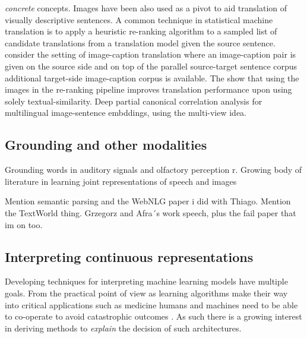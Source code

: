 \emph{concrete} concepts.
Images have been also used as a pivot to aid translation of visually descriptive sentences.
A common technique in statistical machine translation is to apply a heuristic re-ranking algorithm
to a sampled list of candidate translations from a translation model given the source sentence.
\cite{hitschler2016multimodal} consider the setting of image-caption translation where an
image-caption pair is given on the source side and on top of the parallel source-target sentence corpus
additional target-side image-caption corpus is available. The show that using the images in the re-ranking
pipeline improves translation performance upon using solely textual-similarity. 
Deep partial canonical correlation analysis for \cite{rotman2018bridging}
multilingual image-sentence embddings, using the multi-view idea.


\subsection{Grounding and other modalities}
Grounding words in auditory signals \cite{kiela2015multi,lopopolo2015sound} and
 olfactory perception \cite{kiela2015grounding}r. Growing body of literature in learning joint representations
 of speech and images \cite{harwath2016unsupervised,chrupala2017representations,harwath2018jointly}


Mention semantic parsing and the WebNLG paper i did with Thiago. Mention the TextWorld thing. Grzegorz
and Afra´s work speech, plus the fail paper that im on too.

\subsection{Interpreting continuous representations}
\label{sec:interpret}
Developing techniques for interpreting machine learning models have multiple goals. From the practical point of view as learning algorithms
make their way into critical applications such as medicine humans and machines need to be able to co-operate to avoid catastrophic outcomes \cite{caruana2015intelligible}.
As such there is a growing interest in deriving methods to \emph{explain} the decision of such architectures.

